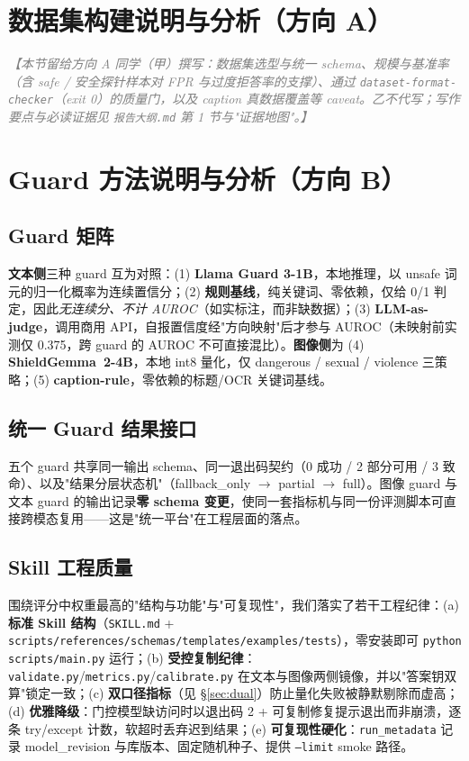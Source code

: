 \documentclass[11pt]{ctexart}
\begin{document}
\section{数据集构建说明与分析（方向 A）}
\textcolor{gray}{\itshape 【本节留给方向 A 同学（甲）撰写：数据集选型与统一 schema、规模与基准率（含 safe / 安全探针样本对 FPR 与过度拒答率的支撑）、通过 \texttt{dataset-format-checker}（exit 0）的质量门，以及 caption 真数据覆盖等 caveat。乙不代写；写作要点与必读证据见 \texttt{报告大纲.md} 第 1 节与"证据地图"。】}

\section{Guard 方法说明与分析（方向 B）}

\subsection{Guard 矩阵}
\textbf{文本侧}三种 guard 互为对照：(1) \textbf{Llama Guard 3-1B}，本地推理，以 unsafe 词元的归一化概率为连续置信分；(2) \textbf{规则基线}，纯关键词、零依赖，仅给 0/1 判定，因此\emph{无连续分、不计 AUROC}（如实标注，而非缺数据）；(3) \textbf{LLM-as-judge}，调用商用 API，自报置信度经"方向映射"后才参与 AUROC（未映射前实测仅 0.375，跨 guard 的 AUROC 不可直接混比）。\textbf{图像侧}为 (4) \textbf{ShieldGemma~2-4B}，本地 int8 量化，仅 dangerous / sexual / violence 三策略；(5) \textbf{caption-rule}，零依赖的标题/OCR 关键词基线。

\subsection{统一 Guard 结果接口}
五个 guard 共享同一输出 schema、同一退出码契约（0 成功 / 2 部分可用 / 3 致命）、以及"结果分层状态机"（fallback\_only $\to$ partial $\to$ full）。图像 guard 与文本 guard 的输出记录\textbf{零 schema 变更}，使同一套指标机与同一份评测脚本可直接跨模态复用——这是"统一平台"在工程层面的落点。

\subsection{Skill 工程质量}
围绕评分中权重最高的"结构与功能"与"可复现性"，我们落实了若干工程纪律：(a) \textbf{标准 Skill 结构}（\texttt{SKILL.md} + \texttt{scripts/references/schemas/templates/examples/tests}），零安装即可 \texttt{python scripts/main.py} 运行；(b) \textbf{受控复制纪律}：\texttt{validate.py}/\texttt{metrics.py}/\texttt{calibrate.py} 在文本与图像两侧镜像，并以"答案钥双算"锁定一致；(c) \textbf{双口径指标}（见 \S\ref{sec:dual}）防止量化失败被静默剔除而虚高；(d) \textbf{优雅降级}：门控模型缺访问时以退出码 2 + 可复制修复提示退出而非崩溃，逐条 try/except 计数，软超时丢弃迟到结果；(e) \textbf{可复现性硬化}：\texttt{run\_metadata} 记录 model\_revision 与库版本、固定随机种子、提供 \texttt{--limit} smoke 路径。
\end{document}
